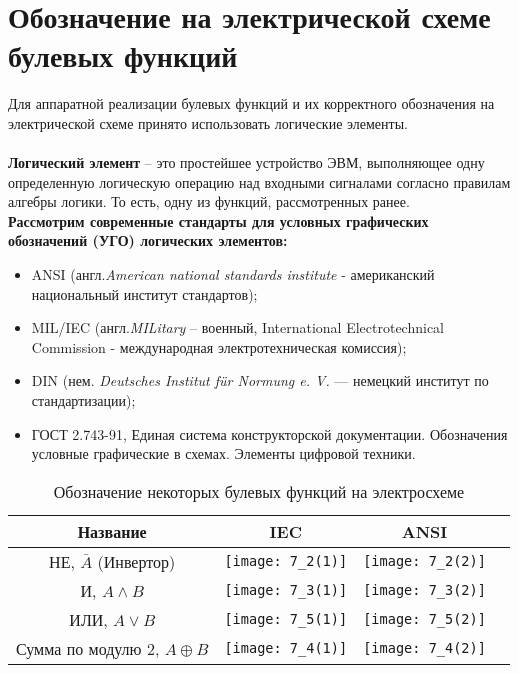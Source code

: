 \section{Обозначение на электрической схеме булевых функций}
Для аппаратной реализации булевых функций и их корректного обозначения на электрической схеме принято использовать логические элементы.
\\
\\\textbf{Логический элемент} – это простейшее устройство ЭВМ, выполняющее одну определенную логическую операцию над входными сигналами согласно правилам алгебры логики. То есть, одну из функций, рассмотренных ранее.\\
\textbf{Рассмотрим современные стандарты для условных графических обозначений (УГО) логических элементов:}

\begin{itemize}
  \item ANSI (англ.\emph{American national standards institute} - американский национальный институт стандартов);
  \item MIL/IEC (англ.\emph{MILitary} – военный, {International Electrotechnical Commission} - международная электротехническая комиссия);
  \item DIN (нем. \emph{Deutsches Institut f{\"u}r Normung e. V.} — немецкий институт по стандартизации);
  \item ГОСТ 2.743-91, Единая система конструкторской документации. Обозначения условные графические в схемах. Элементы цифровой техники. 
\end{itemize}
\begin{table}[!h]
\centering
\caption{Обозначение некоторых булевых функций на электросхеме}
\begin{tabular}{|c|c|c|c|}
\hline
Название & IEC & ANSI \\
\hline
\multirow{3}{*}{НЕ, $\bar{A}$ (Инвертор)} & \multirow{3}{*}{\texttt{[image: 7\_2(1)]}} & \multirow{3}{*}{\texttt{[image: 7\_2(2)]}} \\
& & \\
& & \\
\hline
\multirow{3}{*}{И, $A \wedge B$} & \multirow{3}{*}{\texttt{[image: 7\_3(1)]}} & \multirow{3}{*}{\texttt{[image: 7\_3(2)]}} \\
& & \\
& & \\
\hline
\multirow{3}{*}{ИЛИ, $A \vee B$} & \multirow{3}{*}{\texttt{[image: 7\_5(1)]}} & \multirow{3}{*}{\texttt{[image: 7\_5(2)]}} \\
& & \\
& & \\
\hline
\multirow{3}{*}{Сумма по модулю 2, $A \oplus B$} & \multirow{3}{*}{\texttt{[image: 7\_4(1)]}} & \multirow{3}{*}{\texttt{[image: 7\_4(2)]}} \\
& & \\
& & \\
\hline
\end{tabular}

\end{table}

